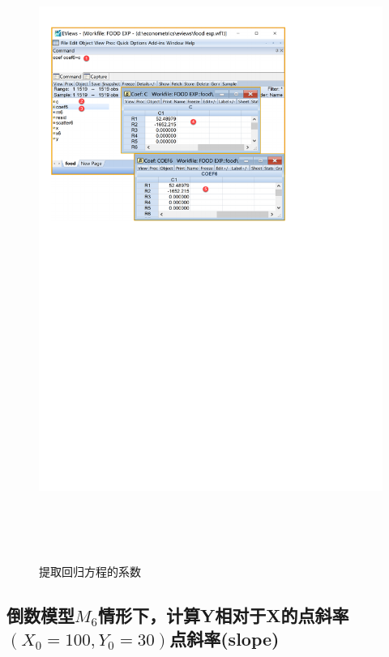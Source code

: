 \documentclass[12pt,(landscape,a4paper),(portrait,a4paper)]{article}
\begin{document}
\begin{figure}

{\centering \includegraphics[width=24.31in,height=8in]{picture/lab3-model-function/coef6} 

}

\caption{提取回归方程的系数}\label{fig:coef6}
\end{figure}

\hypertarget{m_6yxx_0100y_030slope}{%
\subsection{\texorpdfstring{倒数模型\(M_6\)情形下，计算Y相对于X的点斜率\((X_0=100,Y_0=30)\)点斜率(slope)}{倒数模型M\_6情形下，计算Y相对于X的点斜率(X\_0=100,Y\_0=30)点斜率(slope)}}\label{m_6yxx_0100y_030slope}}
\end{document}

